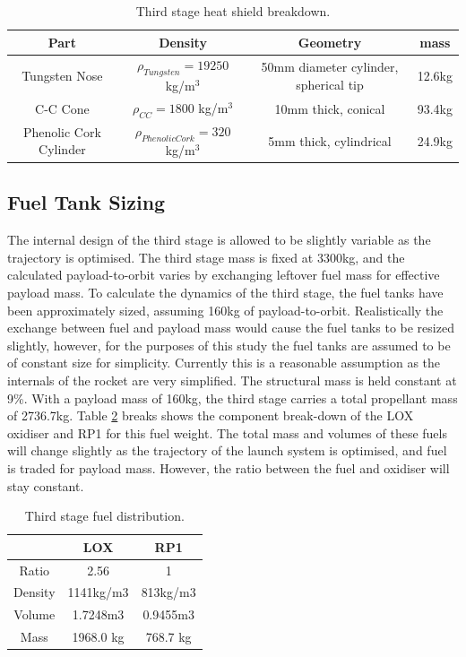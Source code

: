 		\begin{table}[h]
			\centering
\begin{tabular}{|c|c|c|c|}
	\hline  Part & Density & Geometry & mass \\ 
	\hline  Tungsten Nose & $\rho_{Tungsten} = 19250$  kg/m$^3$ & 50mm diameter cylinder, spherical tip & 12.6kg \\ 
		\hline C-C Cone & $\rho_{CC} = 1800$  kg/m$^3$ & 10mm thick, conical & 93.4kg \\ 
			\hline Phenolic Cork Cylinder & $\rho_{Phenolic Cork} = 320$  kg/m$^3$ & 5mm thick, cylindrical & 24.9kg \\ 
	\hline 
\end{tabular} 
\caption{Third stage heat shield breakdown.}
\label{tab:heatshield}
\end{table}
		
		\subsection{Fuel Tank Sizing}
		The internal design of the third stage is allowed to be slightly variable as the trajectory is optimised. The third stage mass is fixed at 3300kg, and the calculated payload-to-orbit varies by exchanging leftover fuel mass for effective payload mass. To calculate the dynamics of the third stage, the fuel tanks have been approximately sized, assuming 160kg of payload-to-orbit. Realistically the exchange between fuel and payload mass would cause the fuel tanks to be resized slightly, however, for the purposes of this study the fuel tanks are assumed to be of constant size for simplicity. Currently this is a reasonable assumption as the internals of the rocket are very simplified. The structural mass is held constant at 9\%. With a payload mass of 160kg, the third stage carries a total propellant mass of 2736.7kg. Table \ref{tab:Fuel} breaks shows the component break-down of the LOX oxidiser and RP1 for this fuel weight. The total mass and volumes of these fuels will change slightly as the trajectory of the launch system is optimised, and fuel is traded for payload mass. However, the ratio between the fuel and oxidiser will stay constant. 
		
		\begin{table}[h]
			\centering
\begin{tabular}{|c|c|c|}
	\hline  & \textbf{LOX} & \textbf{RP1} \\ 
	\hline Ratio & 2.56 & 1 \\ 
	\hline Density & 1141kg/m3 & 813kg/m3\cite{Magee}\\ 
	\hline Volume & 1.7248m3 & 0.9455m3 \\ 
	\hline Mass & 1968.0 kg & 768.7 kg \\ 
	\hline 
\end{tabular} 
\caption{Third stage fuel distribution.}
\label{tab:Fuel}
		\end{table}


